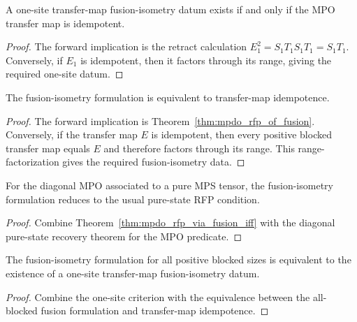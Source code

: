 \begin{theorem}%
    \label{thm:mpdo_one_site_fusion_iff_rfp}
    \leanok
    A one-site transfer-map fusion-isometry datum exists if and only if the MPO
    transfer map is idempotent.
\end{theorem}
\begin{proof}\leanok
    The forward implication is the retract calculation
    $E_1^2 = S_1T_1S_1T_1 = S_1T_1$. Conversely, if $E_1$ is idempotent, then
    it factors through its range, giving the required one-site datum.
\end{proof}

\begin{theorem}%
    \label{thm:mpdo_rfp_via_fusion_iff}
    \leanok
    The fusion-isometry formulation is equivalent to transfer-map idempotence.
\end{theorem}
\begin{proof}\leanok{}
    The forward implication is Theorem~\ref{thm:mpdo_rfp_of_fusion}.
    Conversely, if the transfer map $E$ is idempotent, then every positive blocked
    transfer map equals $E$ and therefore factors through its range.
    This range-factorization gives the required fusion-isometry data.
\end{proof}

\begin{corollary}%
    \label{cor:mpdo_fusion_pure_recovery}
    \leanok
    For the diagonal MPO associated to a pure MPS tensor, the fusion-isometry
    formulation reduces to the usual pure-state RFP condition.
\end{corollary}
\begin{proof}\leanok
    Combine Theorem~\ref{thm:mpdo_rfp_via_fusion_iff} with the diagonal pure-state
    recovery theorem for the MPO predicate.
\end{proof}

\begin{theorem}%
    \label{thm:mpdo_fusion_iff_one_site_fusion}
    \leanok
    The fusion-isometry formulation for all positive blocked sizes is
    equivalent to the existence of a one-site transfer-map fusion-isometry
    datum.
\end{theorem}
\begin{proof}\leanok
    Combine the one-site criterion with the equivalence between the all-blocked
    fusion formulation and transfer-map idempotence.
\end{proof}

